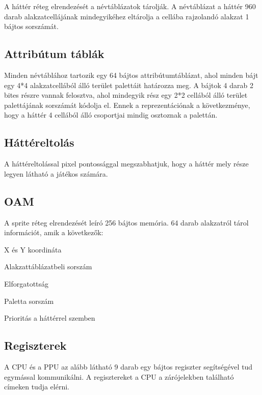 A háttér réteg elrendezését a névtáblázatok tárolják. A névtáblázat a háttér 960 darab alakzatcellájának mindegyikéhez eltárolja a cellába rajzolandó alakzat 1 bájtos sorszámát.

\subsection{Attribútum táblák}

Minden névtáblához tartozik egy 64 bájtos attribútumtáblázat, ahol minden bájt egy 4*4 alakzatcellából álló terület palettáit határozza meg. A bájtok 4 darab 2 bites részre vannak felosztva, ahol mindegyik rész egy 2*2 cellából álló terület palettájának sorszámát kódolja el. Ennek a reprezentációnak a következménye, hogy a háttér 4 cellából álló csoportjai mindig osztoznak a palettán.

\subsection{Háttéreltolás}

A háttéreltolással pixel pontossággal megszabhatjuk, hogy a háttér mely része legyen látható a játékos számára. 

\subsection{OAM}

A sprite réteg elrendezését leíró 256 bájtos memória. 64 darab alakzatról tárol információt, amik a következők:

\begin{compactitem}
	\item X és Y koordináta
	\item Alakzattáblázatbeli sorszám
	\item Elforgatottság
	\item Paletta sorszám
	\item Prioritás a háttérrel szemben
\end{compactitem}


\subsection{Regiszterek}

A CPU és a PPU az alább látható 9 darab egy bájtos regiszter segítségével tud egymással kommunikálni. A regisztereket a CPU a zárójelekben található címeken tudja elérni.

\vspace{0.25cm}


